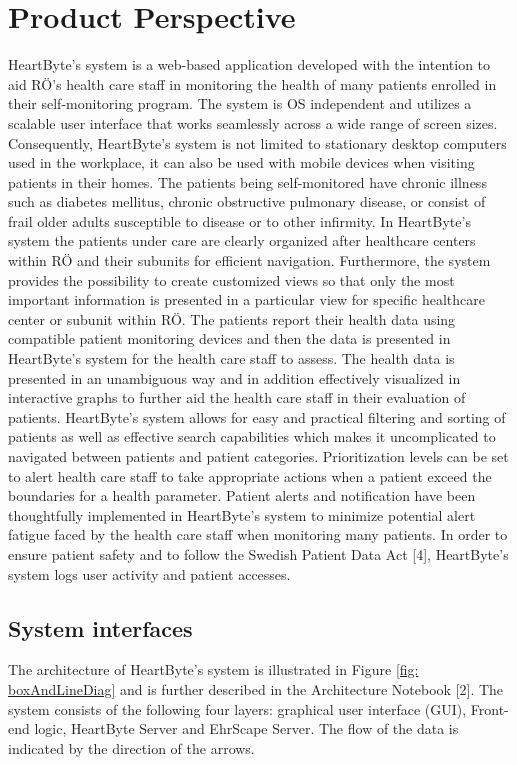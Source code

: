 \documentclass{scrreprt}
\begin{document}
\section{Product Perspective}
HeartByte’s system is a web-based application developed with the intention to aid RÖ’s health care staff in monitoring the health of many patients enrolled in their self-monitoring program. The system is OS independent and utilizes a scalable user interface that works seamlessly across a wide range of screen sizes. Consequently, HeartByte’s system is not limited to stationary desktop computers used in the workplace, it can also be used with mobile devices when visiting patients in their homes. The patients being self-monitored have chronic illness such as diabetes mellitus, chronic obstructive pulmonary disease, or consist of frail older adults susceptible to disease or to other infirmity. In HeartByte’s system the patients under care are clearly organized after healthcare centers within RÖ and their subunits for efficient navigation. Furthermore, the system provides the possibility to create customized views so that only the most important information is presented in a particular view for specific healthcare center or subunit within RÖ. The patients report their health data using compatible patient monitoring devices and then the data is presented in HeartByte’s system for the health care staff to assess. The health data is presented in an unambiguous way and in addition effectively visualized in interactive graphs to further aid the health care staff in their evaluation of patients. HeartByte’s system allows for easy and practical filtering and sorting of patients as well as effective search capabilities which makes it uncomplicated to navigated between patients and patient categories. Prioritization levels can be set to alert health care staff to take appropriate actions when a patient exceed the boundaries for a health parameter. Patient alerts and notification have been thoughtfully implemented in HeartByte’s system to minimize potential alert fatigue faced by the health care staff when monitoring many patients. In order to ensure patient safety and to follow the Swedish Patient Data Act [4], HeartByte’s system logs user activity and patient accesses.  

\subsection{System interfaces}
The architecture of HeartByte’s system is illustrated in Figure \ref{fig: boxAndLineDiag} and is further described in the Architecture Notebook [2]. The system consists of the following four layers: graphical user interface (GUI), Front-end logic, HeartByte Server and EhrScape Server. The flow of the data is indicated by the direction of the arrows. 
\end{document}
